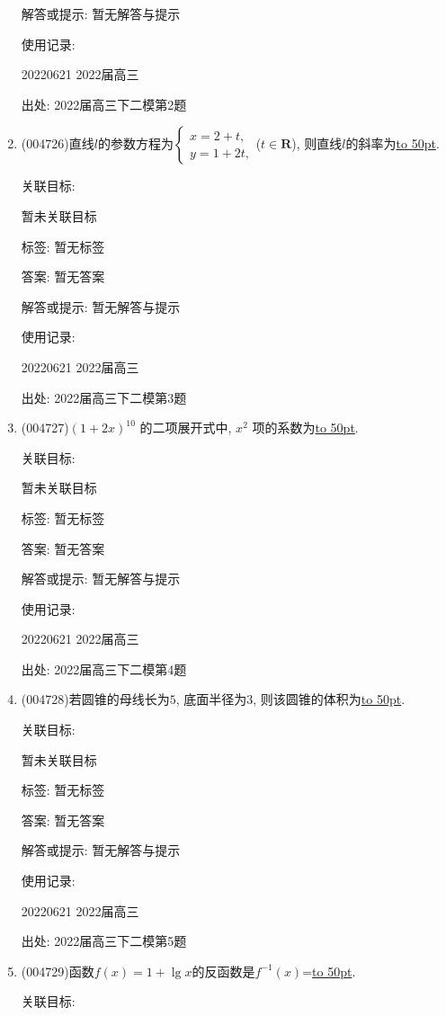 \documentclass[10pt,a4paper]{article}
\newcommand{\blank}[1]{\underline{\hbox to #1pt{}}}
\begin{document}
\begin{enumerate}[1.]
解答或提示: 暂无解答与提示

使用记录:

20220621	2022届高三	


出处: 2022届高三下二模第2题
\item { (004726)}直线$l$的参数方程为$\begin{cases} x=2+t, \\ y=1+2t, \end{cases}$($t\in \mathbf{R}$), 则直线$l$的斜率为\blank{50}.


关联目标:

暂未关联目标



标签: 暂无标签

答案: 暂无答案

解答或提示: 暂无解答与提示

使用记录:

20220621	2022届高三	


出处: 2022届高三下二模第3题
\item { (004727)}$(1+2x)^{10}$ 的二项展开式中, $x^2$ 项的系数为\blank{50}.


关联目标:

暂未关联目标



标签: 暂无标签

答案: 暂无答案

解答或提示: 暂无解答与提示

使用记录:

20220621	2022届高三	


出处: 2022届高三下二模第4题
\item { (004728)}若圆锥的母线长为$5$, 底面半径为$3$, 则该圆锥的体积为\blank{50}.


关联目标:

暂未关联目标



标签: 暂无标签

答案: 暂无答案

解答或提示: 暂无解答与提示

使用记录:

20220621	2022届高三	


出处: 2022届高三下二模第5题
\item { (004729)}函数$f(x)=1+\lg x$的反函数是$f^{-1}(x)$=\blank{50}.


关联目标:


\end{enumerate}
\end{document}
